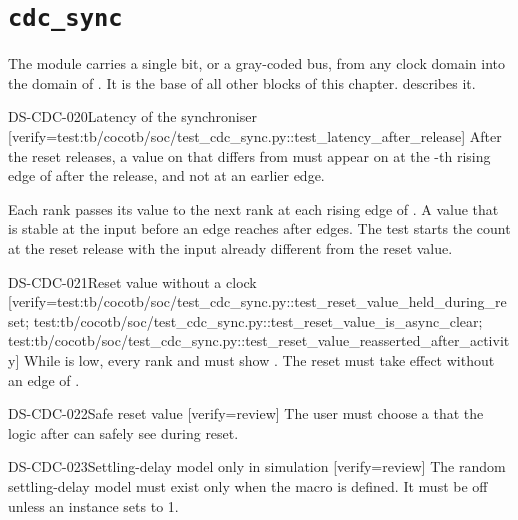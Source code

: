 \section{\texttt{cdc\_sync}}\label{ds:mod:cdc-sync}
The module  carries a single bit, or a gray-coded bus, from any clock domain into the domain of . It is the base of all other blocks of this chapter.  describes it.

\begin{requirement}{DS-CDC-020}{Latency of the synchroniser}
[verify={test:tb/cocotb/soc/test_cdc_sync.py::test_latency_after_release}]
After the reset releases, a value on  that differs from  must appear on  at the -th rising edge of  after the release, and not at an earlier edge.
\end{requirement}
\begin{information}
Each rank passes its value to the next rank at each rising edge of . A value that is stable at the input before an edge reaches  after  edges. The test starts the count at the reset release with the input already different from the reset value.
\end{information}

\begin{requirement}{DS-CDC-021}{Reset value without a clock}
[verify={test:tb/cocotb/soc/test_cdc_sync.py::test_reset_value_held_during_reset; test:tb/cocotb/soc/test_cdc_sync.py::test_reset_value_is_async_clear; test:tb/cocotb/soc/test_cdc_sync.py::test_reset_value_reasserted_after_activity}]
While  is low, every rank and  must show . The reset must take effect without an edge of .
\end{requirement}

\begin{requirement}{DS-CDC-022}{Safe reset value}
[verify={review}]
The user must choose a  that the logic after  can safely see during reset.
\end{requirement}

\begin{requirement}{DS-CDC-023}{Settling-delay model only in simulation}
[verify={review}]
The random settling-delay model must exist only when the macro  is defined. It must be off unless an instance sets  to 1.
\end{requirement}

